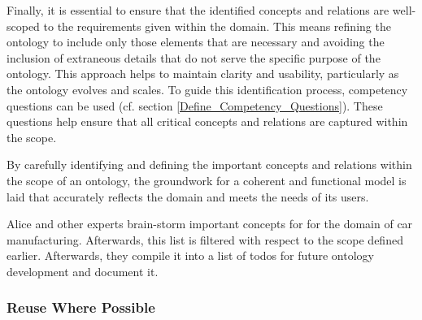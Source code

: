 Finally, it is essential to ensure that the identified concepts and relations are well-scoped to the requirements given within the domain. This means refining the ontology to include only those elements that are necessary and avoiding the inclusion of extraneous details that do not serve the specific purpose of the ontology. This approach helps to maintain clarity and usability, particularly as the ontology evolves and scales. To guide this identification process, competency questions can be used (cf. section \ref{Define_Competency_Questions}). These questions help ensure that all critical concepts and relations are captured within the scope.

By carefully identifying and defining the important concepts and relations within the scope of an ontology, the groundwork for a coherent and functional model is laid that accurately reflects the domain and meets the needs of its users.

\begin{example}
Alice and other experts brain-storm important concepts for for the domain of car manufacturing. Afterwards, this list is filtered with respect to the scope defined earlier. Afterwards, they compile it into a list of todos for future ontology development and document it.
\end{example}

\subsubsection{Reuse Where Possible}

